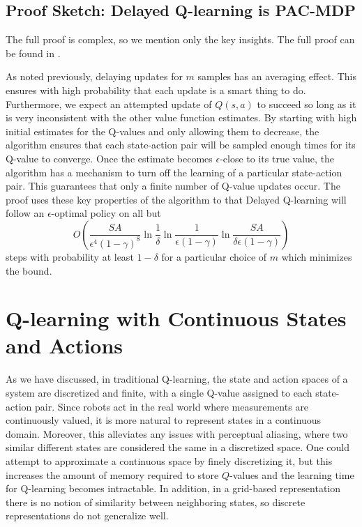 \documentclass{article} %
\begin{document}
\subsection{Proof Sketch: Delayed Q-learning is PAC-MDP}

The full proof is complex, so we mention only the key insights.  The full proof can be found in \cite{strehl_pac_2006}.  

As noted previously, delaying updates for $m$ samples has an averaging effect.  This ensures with high probability that each update is a smart thing to do.  Furthermore, we expect an attempted update of $Q(s,a)$ to succeed so long as it is very inconsistent with the other value function estimates.  By starting with high initial estimates for the Q-values and only allowing them to decrease, the algorithm ensures that each state-action pair will be sampled enough times for its Q-value to converge.  Once the estimate becomes $\epsilon$-close to its true value, the algorithm has a mechanism to turn off the learning of a particular state-action pair.  This guarantees that only a finite number of Q-value updates occur.  The proof uses these key properties of the algorithm to that Delayed Q-learning will follow an $\epsilon$-optimal policy on all but $$O\left(\frac{SA}{\epsilon^4(1-\gamma)^8}\ln{\frac{1}{\delta}}\ln{\frac{1}{\epsilon(1-\gamma)}}\ln{\frac{SA}{\delta\epsilon(1-\gamma)}}\right)$$ steps with probability at least $1-\delta$ for a particular choice of $m$ which minimizes the bound.

\section{Q-learning with Continuous States and Actions}
As we have discussed, in traditional Q-learning, the state and action spaces of a system are discretized and finite, with a single Q-value assigned to each state-action pair.  Since robots act in the real world where measurements are continuously valued, it is more natural to represent states in a continuous domain.  Moreover, this alleviates any issues with perceptual aliasing, where two similar different states are considered the same in a discretized space.  One could attempt to approximate a continuous space by finely discretizing it, but this increases the amount of memory required to store $Q$-values and the learning time for Q-learning becomes intractable.  In addition, in a grid-based representation there is no notion of similarity between neighboring states, so discrete representations do not generalize well.  
\end{document}

